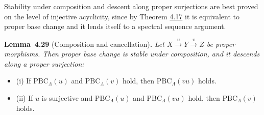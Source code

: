 \documentclass[11pt]{article}
\newenvironment{bpstatement}[2]{\par\addvspace{0.6\baselineskip}\noindent\textbf{#1}#2\textbf{.}\enspace\ignorespaces}
  {\par\addvspace{0.4\baselineskip}}
\newenvironment{bpstatementit}[2]{\begin{bpstatement}{#1}{#2}\itshape\ignorespaces}{\end{bpstatement}}
\begin{document}
\label{bp368}%
Stability under composition and descent along proper surjections are best proved on the level of injective acyclicity, since by Theorem \hyperref[bp329]{4.17} it is equivalent to proper base change and it lends itself to a spectral sequence argument.

\label{bp369}%
\begin{bpstatementit}{Lemma~4.29}{ (Composition and cancellation)}
Let \(X\xrightarrow{u}Y\xrightarrow{v}Z\) be proper morphisms. Then proper base change is stable under composition, and it descends along a proper surjection:

\begin{itemize}
\item (i) If \(\mathrm{PBC}_\Lambda(u)\) and \(\mathrm{PBC}_\Lambda(v)\) hold, then \(\mathrm{PBC}_\Lambda(vu)\) holds.
\item (ii) If \(u\) is surjective and \(\mathrm{PBC}_\Lambda(u)\) and \(\mathrm{PBC}_\Lambda(vu)\) hold, then \(\mathrm{PBC}_\Lambda(v)\) holds.
\end{itemize}
\end{bpstatementit}
\end{document}
